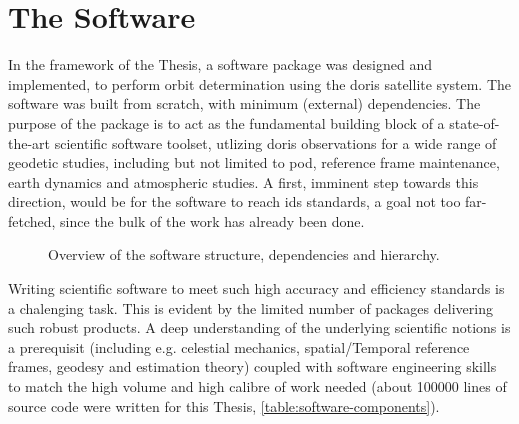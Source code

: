 \section{The Software}\label{sec:the-software}

In the framework of the Thesis, a software package was designed and implemented, to 
perform orbit determination using the \gls{doris} satellite system. The software 
was built from scratch, with minimum (external) dependencies. The purpose of the 
package is to act as the fundamental building block of a state-of-the-art scientific 
software toolset, utlizing \gls{doris} observations for a wide range of geodetic 
studies, including but not limited to \gls{pod}, reference frame maintenance, 
earth dynamics and atmospheric studies. A first, imminent step towards this direction, 
would be for the software to reach \gls{ids} standards, a goal not too far-fetched, 
since the bulk of the work has already been done.

\begin{figure}
  \centering
  
  \caption{Overview of the software structure, dependencies and hierarchy.}
  \label{fig:software-hierarchy}
\end{figure}

Writing scientific software to meet such high accuracy and efficiency standards 
is a chalenging task. This is evident by the limited number of packages delivering 
such robust products. A deep understanding of the underlying scientific notions is 
a prerequisit (including e.g. celestial mechanics, spatial/Temporal reference frames, 
geodesy and estimation theory) coupled with software engineering skills to match the 
high volume and high calibre of work needed (about 100000 lines of source code were 
written for this Thesis, \autoref{table:software-components}).

